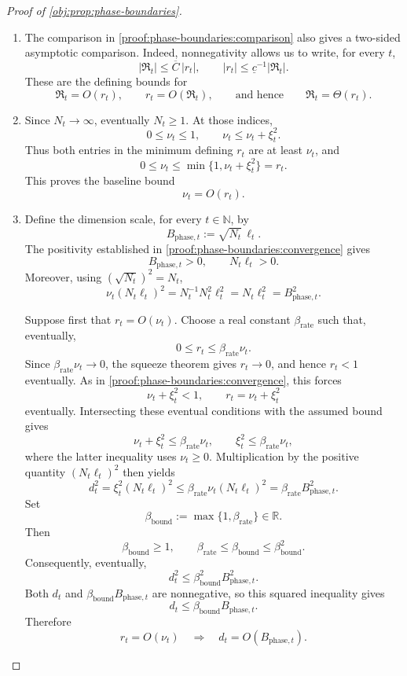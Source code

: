 \begin{proof}[Proof of \cref{obj:prop:phase-boundaries}]
\begin{enumerate}
\item\label{proof:phase-boundaries:theta-comparison} The comparison in \cref{proof:phase-boundaries:comparison} also gives a two-sided asymptotic comparison. Indeed, nonnegativity allows us to write, for every \(t\),
\[
|\mathfrak R_t|
\le\overline C\,|r_t|,
\qquad
|r_t|
\le\underline c^{-1}|\mathfrak R_t|.
\]
These are the defining bounds for
\[
\mathfrak R_t=O(r_t),
\qquad
r_t=O(\mathfrak R_t),
\qquad\text{and hence}\qquad
\mathfrak R_t=\Theta(r_t).
\]

\item\label{proof:phase-boundaries:baseline} Since \(N_t\to\infty\), eventually \(N_t\ge1\). At those indices,
\[
0\le\nu_t\le1,
\qquad
\nu_t\le\nu_t+\xi_t^2.
\]
Thus both entries in the minimum defining \(r_t\) are at least \(\nu_t\), and
\[
0\le\nu_t\le\min\{1,\nu_t+\xi_t^2\}=r_t.
\]
This proves the baseline bound
\[
\nu_t=O(r_t).
\]

\item\label{proof:phase-boundaries:dimension-necessity} Define the dimension scale, for every \(t\in\mathbb N\), by
\[
B_{\mathrm{phase},t}:=\sqrt{N_t}\,\ell_t.
\]
The positivity established in \cref{proof:phase-boundaries:convergence} gives
\[
B_{\mathrm{phase},t}>0,
\qquad
N_t\ell_t>0.
\]
Moreover, using \((\sqrt{N_t})^2=N_t\),
\[
\nu_t(N_t\ell_t)^2
=N_t^{-1}N_t^2\ell_t^2
=N_t\ell_t^2
=B_{\mathrm{phase},t}^2.
\]

Suppose first that \(r_t=O(\nu_t)\). Choose a real constant
\(\beta_{\mathrm{rate}}\) such that, eventually,
\[
0\le r_t\le\beta_{\mathrm{rate}}\nu_t.
\]
Since \(\beta_{\mathrm{rate}}\nu_t\to0\), the squeeze theorem gives \(r_t\to0\), and hence \(r_t<1\) eventually. As in \cref{proof:phase-boundaries:convergence}, this forces
\[
\nu_t+\xi_t^2<1,
\qquad
r_t=\nu_t+\xi_t^2
\]
eventually. Intersecting these eventual conditions with the assumed bound gives
\[
\nu_t+\xi_t^2\le\beta_{\mathrm{rate}}\nu_t,
\qquad
\xi_t^2\le\beta_{\mathrm{rate}}\nu_t,
\]
where the latter inequality uses \(\nu_t\ge0\). Multiplication by the positive quantity \((N_t\ell_t)^2\) then yields
\[
d_t^2
=\xi_t^2(N_t\ell_t)^2
\le\beta_{\mathrm{rate}}\nu_t(N_t\ell_t)^2
=\beta_{\mathrm{rate}}B_{\mathrm{phase},t}^2.
\]
Set
\[
\beta_{\mathrm{bound}}:=\max\{1,\beta_{\mathrm{rate}}\}\in\mathbb R.
\]
Then
\[
\beta_{\mathrm{bound}}\ge1,\qquad
\beta_{\mathrm{rate}}\le\beta_{\mathrm{bound}}
\le\beta_{\mathrm{bound}}^2.
\]
Consequently, eventually,
\[
d_t^2
\le\beta_{\mathrm{bound}}^2B_{\mathrm{phase},t}^2.
\]
Both \(d_t\) and \(\beta_{\mathrm{bound}}B_{\mathrm{phase},t}\) are nonnegative, so this squared inequality gives
\[
d_t\le\beta_{\mathrm{bound}}B_{\mathrm{phase},t}.
\]
Therefore
\[
r_t=O(\nu_t)
\quad\Longrightarrow\quad
d_t=O(B_{\mathrm{phase},t}).
\]


\end{enumerate}
\end{proof}
